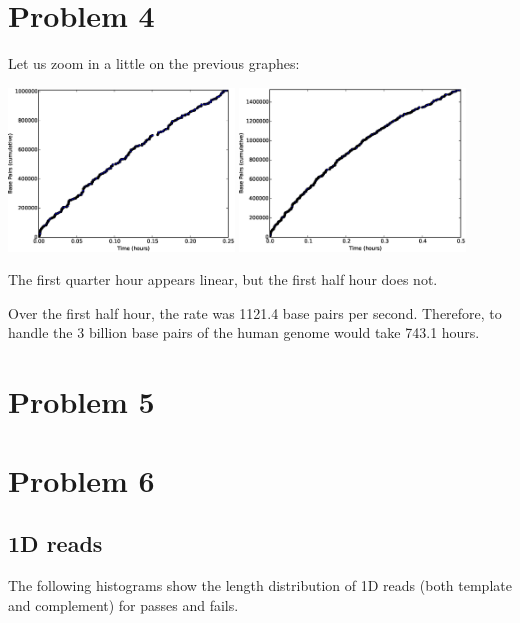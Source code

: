 \documentclass[11pt]{article}
\begin{document}
\section*{Problem 4}
Let us zoom in a little on the previous graphes:

\includegraphics[width=0.45\textwidth]{q4qh}
\includegraphics[width=0.45\textwidth]{q4hh}

The first quarter hour appears linear, but the first half hour does not.


Over the first half hour, the rate was 1121.4 base pairs per second.  Therefore, to handle the 3 billion base pairs of the human genome would take 743.1 hours.
\section*{Problem 5}
\section*{Problem 6}
\subsection*{1D reads}

        The following histograms show the length distribution of 1D reads (both template and complement) for passes and fails.
\end{document}
